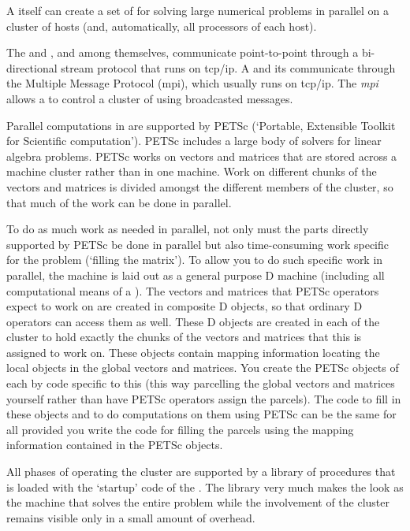 A  itself can create a set of  for solving
large numerical problems in parallel on a cluster of hosts (and,
automatically, all processors of each host).

The  and , and 
among themselves, communicate point-to-point through a bi-directional
stream protocol that runs on tcp/ip. A  and its
 communicate through the Multiple Message
Protocol (mpi), which usually runs on tcp/ip. The \emph{mpi} allows a
 to control a cluster of  using
broadcasted messages.

Parallel computations in  are supported by PETSc
(`Portable, Extensible Toolkit for Scientific computation'). PETSc
includes a large body of solvers for linear algebra problems. PETSc
works on vectors and matrices that are stored across a machine cluster
rather than in one machine. Work on different chunks of the vectors
and matrices is divided amongst the different members of the cluster,
so that much of the work can be done in parallel.

To do as much work as needed in parallel, not only must the parts
directly supported by PETSc be done in parallel but also
time-consuming work specific for the problem (`filling the
matrix'). To allow you to do such specific work in parallel, the
 machine is laid out as a general purpose D machine
(including all computational means of a ). The vectors
and matrices that PETSc operators expect to work on are created in
composite D objects, so that ordinary D operators can access them as
well. These D objects are created in each  of the cluster
to hold exactly the chunks of the vectors and matrices that this
 is assigned to work on. These objects contain mapping
information locating the local objects in the global vectors and
matrices. You create the PETSc objects of each  by code
specific to this  (this way parcelling the global vectors
and matrices yourself rather than have PETSc operators assign the
parcels). The code to fill in these objects and to do computations on
them using PETSc can be the same for all 
provided you write the code for filling the parcels using the mapping
information contained in the PETSc objects.

All phases of operating the  cluster are supported by a
library of procedures that is loaded with the `startup' code of the
. The library very much makes the  look as the
machine that solves the entire problem while the involvement of the
 cluster remains visible only in a small amount of
overhead.

